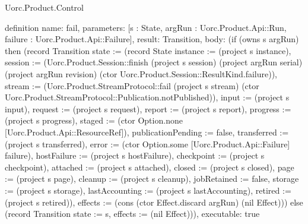 \begin{lexlean}{Uorc.Product.Control}
\begin{semanticmodule}
definition{
  name: fail,
  parameters: [s : State, argRun : Uorc.Product.Api::Run, failure : Uorc.Product.Api::Failure],
  result: Transition,
  body: (if (owns s argRun) then (record Transition {state := (record State {instance := (project s instance), session := (Uorc.Product.Session::finish (project s session) (project argRun serial) (project argRun revision) (ctor Uorc.Product.Session::ResultKind.failure)), stream := (Uorc.Product.StreamProtocol::fail (project s stream) (ctor Uorc.Product.StreamProtocol::Publication.notPublished)), input := (project s input), request := (project s request), report := (project s report), progress := (project s progress), staged := (ctor Option.none [Uorc.Product.Api::ResourceRef]), publicationPending := false, transferred := (project s transferred), error := (ctor Option.some [Uorc.Product.Api::Failure] failure), hostFailure := (project s hostFailure), checkpoint := (project s checkpoint), attached := (project s attached), closed := (project s closed), page := (project s page), cleanup := (project s cleanup), jobRetained := false, storage := (project s storage), lastAccounting := (project s lastAccounting), retired := (project s retired)}), effects := (cons (ctor Effect.discard argRun) (nil Effect))}) else (record Transition {state := s, effects := (nil Effect)})),
  executable: true
}


\end{semanticmodule}
\end{lexlean}
